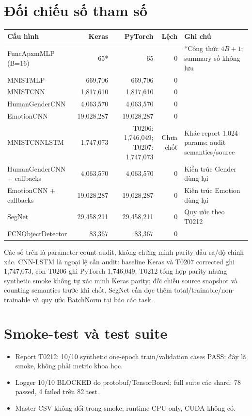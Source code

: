 \section{Đối chiếu số tham số}
\begin{longtable}{p{}r r r p{}}
\toprule Cấu hình & Keras & PyTorch & Lệch & Ghi chú \\
\midrule
FuncApxmMLP (B=16) & 65* & 65 & 0 & *Công thức $4B+1$; summary số không lưu \\
MNISTMLP & 669,706 & 669,706 & 0 & \\
MNISTCNN & 1,817,610 & 1,817,610 & 0 & \\
HumanGenderCNN & 4,063,570 & 4,063,570 & 0 & \\
EmotionCNN & 19,028,287 & 19,028,287 & 0 & \\
MNISTCNNLSTM & 1,747,073 & T0206: 1,746,049; T0207: 1,747,073 & Chưa chốt & Khác report 1,024 params; audit semantics/source \\
HumanGenderCNN + callbacks & 4,063,570 & 4,063,570 & 0 & Kiến trúc Gender dùng lại \\
EmotionCNN + callbacks & 19,028,287 & 19,028,287 & 0 & Kiến trúc Emotion dùng lại \\
SegNet & 29,458,211 & 29,458,211 & 0 & Quy ước theo T0212 \\
FCNObjectDetector & 83,367 & 83,367 & 0 & \\
\bottomrule
\end{longtable}
Các số trên là parameter-count audit, không chứng minh parity đầu ra/độ chính xác. CNN-LSTM là ngoại lệ cần audit: baseline Keras và T0207 corrected ghi 1,747,073, còn T0206 ghi PyTorch 1,746,049. T0212 tổng hợp parity nhưng synthetic smoke không tự xác minh Keras parity; đối chiếu source snapshot và counting semantics trước khi chốt. SegNet cần đọc thêm total/trainable/non-trainable và quy ước BatchNorm tại báo cáo task.

\section{Smoke-test và test suite}
\begin{itemize}
\item Report T0212: 10/10 synthetic one-epoch train/validation cases PASS; đây là smoke, không phải metric khoa học.
\item Logger 10/10 BLOCKED do protobuf/TensorBoard; full suite các shard: 78 passed, 4 failed trên 82 test.
\item Master CSV không đổi trong smoke; runtime CPU-only, CUDA không có.
\end{itemize}

